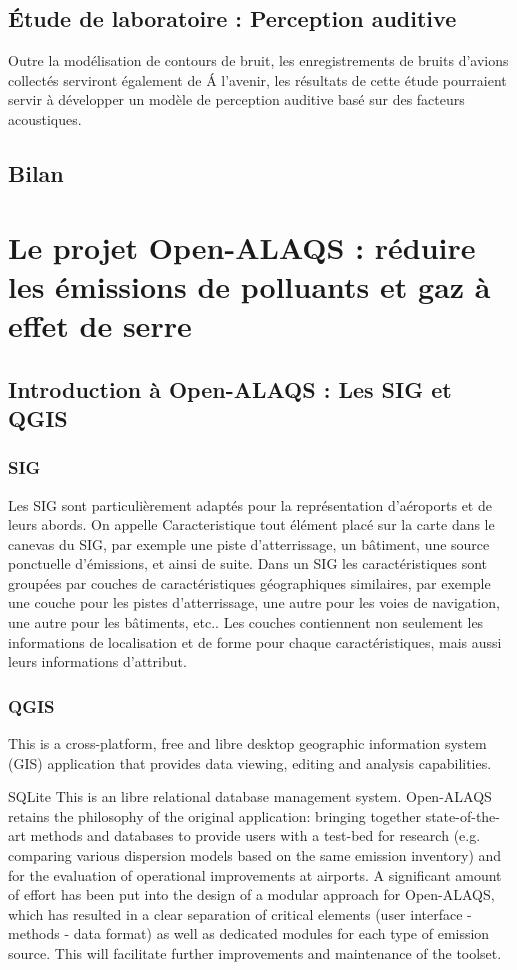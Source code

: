 \documentclass[a4paper,12pt,twoside]{article}
\begin{document}
    \subsection{\'Etude de laboratoire : Perception auditive}
    Outre la modélisation de contours de bruit, les enregistrements de bruits d'avions collectés serviront également de 
    \'A l'avenir, les résultats de cette étude pourraient servir à développer un modèle de perception auditive basé sur des facteurs acoustiques.
    \subsection{Bilan}
    \newpage
    
    \section{Le projet Open-ALAQS : réduire les émissions de polluants et gaz à effet de serre}
    \subsection{Introduction à Open-ALAQS : Les SIG et QGIS}
    \subsubsection*{SIG}
    Les \gls{SIG} sont particulièrement adaptés pour la représentation d'aéroports et de leurs abords. On appelle \gls{Caracteristique} tout élément placé sur la carte dans le canevas du \gls{SIG}, par exemple une piste d'atterrissage, un bâtiment, une source ponctuelle d'émissions, et ainsi de suite. Dans un \gls{SIG} les caractéristiques sont groupées par couches de caractéristiques géographiques similaires, par exemple une couche pour les pistes d'atterrissage, une autre pour les voies de navigation, une autre pour les bâtiments, etc.. Les couches contiennent non seulement les informations de localisation et de forme pour chaque caractéristiques, mais aussi leurs informations d'attribut.
    \subsubsection*{QGIS}
    
    This is a cross-platform, free and libre desktop geographic information system (GIS) application that provides data viewing, editing and analysis capabilities.
    
    SQLite	This is an libre relational database management system.
    Open-ALAQS retains the philosophy of the original application: bringing together state-of-the-art methods and databases to provide users with a test-bed for research (e.g. comparing various dispersion models based on the same emission inventory) and for the evaluation of operational improvements at airports. A significant amount of effort has been put into the design of a modular approach for Open-ALAQS, which has resulted in a clear separation of critical elements (user interface - methods - data format) as well as dedicated modules for each type of emission source. This will facilitate further improvements and maintenance of the toolset.
    
\end{document}
